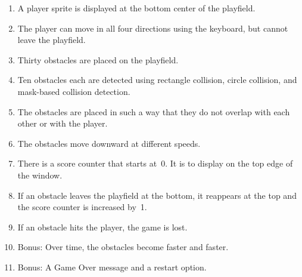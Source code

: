 \begin{enumerate}
	\item A player sprite is displayed at the bottom center of the playfield.
	
	\item The player can move in all four directions using the keyboard, but cannot leave the playfield.
	
	\item Thirty obstacles are placed on the playfield.
	
	\item Ten obstacles each are detected using rectangle collision, circle collision, and mask-based collision detection.
	
	\item The obstacles are placed in such a way that they do not overlap with each other or with the player.
	
	\item The obstacles move downward at different speeds.
	
	\item There is a score counter that starts at~0. It is to display on the top edge of the window.
	
	\item If an obstacle leaves the playfield at the bottom, it reappears at the top and the score counter is increased by~1.
	
	\item If an obstacle hits the player, the game is lost.
	
	\item Bonus: Over time, the obstacles become faster and faster.
	
	\item Bonus: A Game Over message and a restart option.
\end{enumerate}



